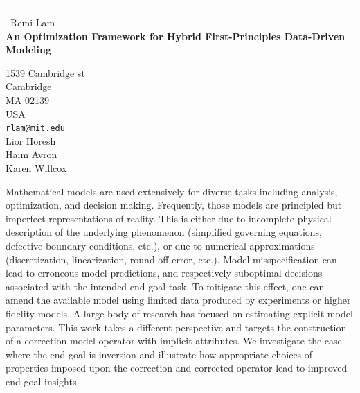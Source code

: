 \documentclass{report}
\begin{document}
\begin{center}
\rule{6in}{1pt} \
{\large Remi Lam \\
{\bf An Optimization Framework for Hybrid First-Principles Data-Driven Modeling}}

1539 Cambridge st \\ Cambridge \\ MA 02139 \\ USA
\\
{\tt rlam@mit.edu}\\
Lior Horesh\\
Haim Avron\\
Karen Willcox\end{center}

Mathematical models are used extensively for diverse tasks including
analysis, optimization, and decision making.
Frequently, those models are principled but imperfect representations of reality.
This is either due to incomplete physical description of the underlying
phenomenon (simplified governing equations, defective boundary
conditions, etc.), or due to numerical approximations (discretization,
linearization, round-off error, etc.).
Model misspecification can lead to erroneous model predictions, and
respectively suboptimal decisions associated with the intended end-goal
task.
To mitigate this effect, one can amend the available model using limited
data produced by experiments or higher fidelity models.
A large body of research has focused on estimating explicit model parameters.
This work takes a different perspective and targets the construction of a
correction model operator with implicit attributes.
We investigate the case where the end-goal is inversion and illustrate
how appropriate choices of properties imposed upon the correction and
corrected operator lead to improved end-goal insights.
\end{document}

